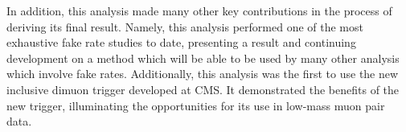 In addition, this analysis made many other key contributions in the process of deriving its final result. Namely, this analysis performed one of the most exhaustive fake rate studies to date, presenting a result and continuing development on a method which will be able to be used by many other analysis which involve fake rates. Additionally, this analysis was the first to use the new inclusive dimuon trigger developed at CMS. It demonstrated the benefits of the new trigger, illuminating the opportunities for its use in low-mass muon pair data. 

